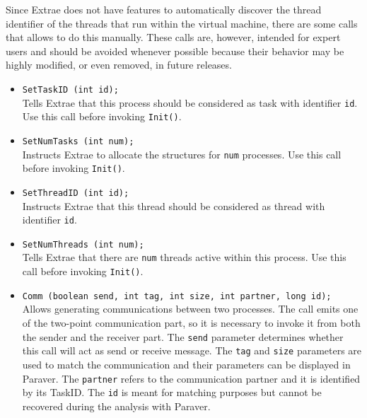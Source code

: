 Since Extrae does not have features to automatically discover the thread identifier of the threads that run within the virtual machine, there are some calls that allows to do this manually.
These calls are, however, intended for expert users and should be avoided whenever possible because their behavior may be highly modified, or even removed, in future releases.

\begin{itemize}

  \item {\texttt{SetTaskID (int id);}}\\
  Tells Extrae that this process should be considered as task with identifier \texttt{id}. Use this call before invoking \texttt{Init()}.

  \item {\texttt{SetNumTasks (int num);}}\\
  Instructs Extrae to allocate the structures for \texttt{num} processes. Use this call before invoking \texttt{Init()}.
%
  \item {\texttt{SetThreadID (int id);}}\\
  Instructs Extrae that this thread should be considered as thread with identifier \texttt{id}.

  \item {\texttt{SetNumThreads (int num);}}\\
  Tells Extrae that there are \texttt{num} threads active within this process. Use this call before invoking \texttt{Init()}.

  \item {\texttt{Comm (boolean send, int tag, int size, int partner, long id);}}\\
  Allows generating communications between two processes. The call emits one of the two-point communication part, so it is necessary to invoke it from both the sender and the receiver part. The \texttt{send} parameter determines whether this call will act as send or receive message. The \texttt{tag} and \texttt{size} parameters are used to match the communication and their parameters can be displayed in Paraver. The \texttt{partner} refers to the communication partner and it is identified by its TaskID. The \texttt{id} is meant for matching purposes but cannot be recovered during the analysis with Paraver.

\end{itemize}

